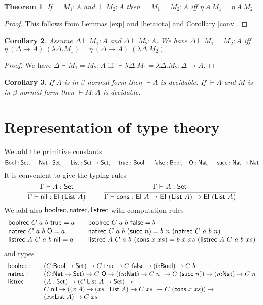 \documentclass[11pt]{article}
\newtheorem{theorem}{Theorem}[section]
\newtheorem{corollary}[theorem]{Corollary}
\def\SET{\hbox{\sf Set}}
\def\EL{\hbox{\sf El}}
\def\NAT{\hbox{\sf Nat}}
\def\NATREC{\hbox{\sf natrec}}
\def\BOOLREC{\hbox{\sf boolrec}}
\def\LISTREC{\hbox{\sf listrec}}
\def\LIST{\hbox{\sf List}}
\def\ZERO{\hbox{\sf O}}
\def\SUCC{\hbox{\sf succ}}
\def\NIL{\hbox{\sf nil}}
\def\CONS{\hbox{\sf cons}}
\def\BOOL{\hbox{\sf Bool}}
\def\TRUE{\hbox{\sf true}}
\def\FALSE{\hbox{\sf false}}
\begin{document}
\begin{theorem}
If $\vdash M_1:A$ and $\vdash M_2:A$ then $\vdash M_1=M_2:A$ iff
$\eta~A~M_1=\eta~A~M_2$
\end{theorem}

\begin{proof}
This follows from Lemmas \ref{exp} and \ref{betaiota} and Corollary \ref{conv}.
\end{proof}

\begin{corollary}
Assume $\Delta\vdash M_1:A$ and $\Delta\vdash M_2:A$. We have $\Delta\vdash M_1=M_2:A$ iff
$\eta~(\Delta\rightarrow A)~(\lambda\Delta.M_1)=\eta~(\Delta\rightarrow A)~(\lambda\Delta.M_2)$
\end{corollary}

\begin{proof}
We have $\Delta\vdash M_1=M_2:A$ iff $\vdash \lambda\Delta.M_1 = \lambda\Delta.M_2:\Delta\rightarrow A$.
\end{proof}

\begin{corollary}
If $A$ is in $\beta$-normal form then $\vdash A$ is decidable. If $\vdash A$ and $M$ is
in $\beta$-normal form then $\vdash M:A$ is decidable.
\end{corollary}

\section{Representation of type theory}

 We add the primitive constants
$$
\BOOL:\SET,~~~~\NAT:\SET,~~~~\LIST:\SET\rightarrow\SET,~~~~\TRUE:\BOOL,~~~~\FALSE:\BOOL,~~~
\ZERO:\NAT,~~~~\SUCC:\NAT\rightarrow\NAT
$$ 
 It is convenient to give the typing rules
$$
\frac{\Gamma\vdash A:\SET}{\Gamma\vdash \NIL:\EL~(\LIST~A)}~~~~~~~
\frac{\Gamma\vdash A:\SET}{\Gamma\vdash \CONS:\EL~A\rightarrow \EL~(\LIST~A)\rightarrow \EL~(\LIST~A)}
$$
 We add also $\BOOLREC,\NATREC,\LISTREC$ with computation rules
$$
\begin{array}{lcl}
\BOOLREC~C~a~b~\TRUE = a & & \BOOLREC~C~a~b~\FALSE = b \\
\NATREC~C~a~b~\ZERO = a  & & \NATREC~C~a~b~(\SUCC~n) = b~n~(\NATREC~C~a~b~n) \\
\LISTREC~A~C~a~b~\NIL = a  & & \LISTREC~A~C~a~b~(\CONS~x~xs) = b~x~xs~(\LISTREC~A~C~a~b~xs)
\end{array}
$$
and types
$$
\begin{array}{lcl}
\BOOLREC:& & (C{:}\BOOL\rightarrow\SET)\rightarrow C~\TRUE\rightarrow C~\FALSE
                \rightarrow (b{:}\BOOL)\rightarrow C~b \\
\NATREC:& & (C{:}\NAT\rightarrow\SET)\rightarrow C~\ZERO\rightarrow ((n{:}\NAT)\rightarrow C~n~\rightarrow C~(\SUCC~n))
                \rightarrow (n{:}\NAT)\rightarrow C~n \\
\LISTREC:& & (A:\SET)\rightarrow (C{:}\LIST~A\rightarrow\SET)\rightarrow \\
 & &  C~\NIL\rightarrow ((x{:}A)\rightarrow (xs:\LIST~A)\rightarrow C~xs~\rightarrow C~(\CONS~x~xs)) \rightarrow \\
 & & (xs{:}\LIST~A)\rightarrow C~xs 
\end{array}
$$
\end{document}
